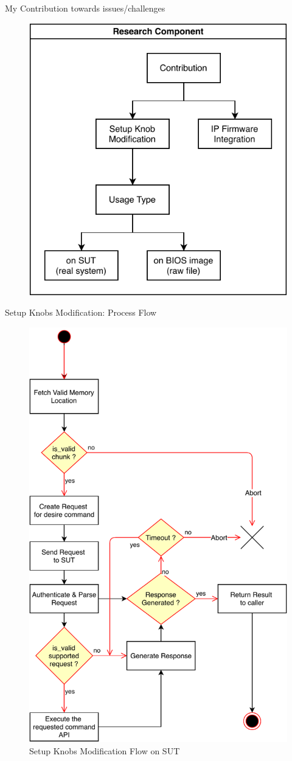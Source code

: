 
\begin{frame}{My Contribution towards issues/challenges}
    \begin{figure}
        \centering
        \includegraphics[width=0.6\linewidth]{Im/figures/research-component.pdf}
    \end{figure}
\end{frame}

\begin{frame}[allowframebreaks]{Setup Knobs Modification: Process Flow}
    \begin{figure}[htbp]
        \centering
        \includegraphics[width=0.3\linewidth]{Im/figures/mod-setup-knobs-flow.pdf}
        \caption{Setup Knobs Modification Flow on SUT}
        \label{fig:setup-knobs-flow}
    \end{figure}
    
\end{frame}


